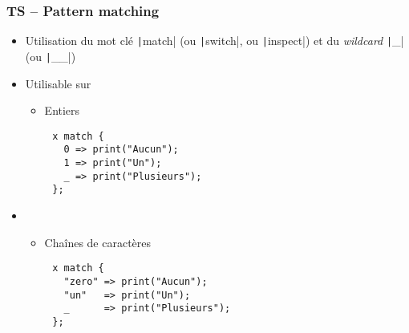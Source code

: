 \documentclass[C++.tex]{subfiles}
\begin{document}
\begin{frame}[fragile]
	\frametitle{TS -- Pattern matching}
	\begin{itemize}
		\item Utilisation du mot clé \texttt|match| (ou \texttt|switch|, ou \texttt|inspect|) et du \textit{wildcard} \texttt|_| (ou \texttt|__|)
		\item Utilisable sur
		\begin{itemize}
			\item Entiers
		\end{itemize}
	\end{itemize}

	\begin{verbatim}
		x match {
		  0 => print("Aucun");
		  1 => print("Un");
		  _ => print("Plusieurs");
		};
	\end{verbatim}

	\begin{itemize}
		\item[]
		\begin{itemize}
			\item Chaînes de caractères
		\end{itemize}
	\end{itemize}

	\begin{verbatim}
		x match {
		  "zero" => print("Aucun");
		  "un"   => print("Un");
		  _      => print("Plusieurs");
		};
	\end{verbatim}

	\begin{codesample}
		\sample{https://godbolt.org/#g:!((g:!((g:!((h:codeEditor,i:(filename:'1',fontScale:14,fontUsePx:'0',j:1,lang:c%

}
\end{codesample}
\end{frame}
\end{document}
